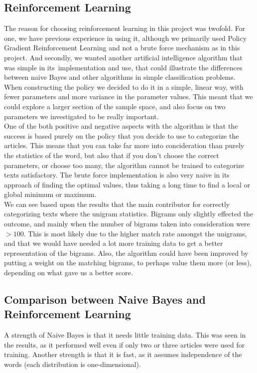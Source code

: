 \documentclass[a4paper,10pt]{article}
\begin{document}
\subsection{Reinforcement Learning}
 
The reason for choosing reinforcement learning in this project was twofold. For one, we have previous experience in using it, although we primarily used Policy Gradient Reinforcement Learning and not a brute force mechanism as in this project. And secondly, we wanted another artificial intelligence algorithm that was simple in its\
implementation and use, that could illustrate the differences between naive Bayes and other algorithms in simple classification problems.
When constructing the policy we decided to do it in a simple, linear way, with fewer parameters and more variance in the parameter values. This meant that we could explore a larger section of the sample space, and also focus on two parameters we investigated to be really important.\\
One of the both positive and negative aspects with the algorithm is that the success is based purely on the policy that you decide to use to categorize the articles. This means that you can take far more into concideration than purely the statistics of the word, but also that if you don't choose the correct parameters, or choose too many, the algorithm cannot be trained to categorize texts satisfactory. The brute force implementation is also very naive in its approach of finding the optimal values, thus taking a long time to find a local or global minimum or maximum.\\
We can see based upon the results that the main contributor for correctly categorizing texts where the unigram statistics. Bigrams only slightly effected the outcome, and mainly when the number of bigrams taken into consideration were $>100.$ This is most likely due to the higher match rate amongst the unigrams, and that we would have needed a lot more training data to get a better representation of the bigrams. Also, the algorithm could have been improved by putting a weight on the matching bigrams, to perhaps value them more (or less), depending on what gave us a better score.
 


\subsection{Comparison between Naive Bayes and Reinforcement Learning}

A strength of Naive Bayes is that it needs little training data\cite{NBtrainsize}. This was seen in the results, as it performed well even if only two or three articles were used for training. Another strength is that it is fast, as it assumes independence\cite{NBfast} of the words (each distribution is one-dimensional). \\
\end{document}
